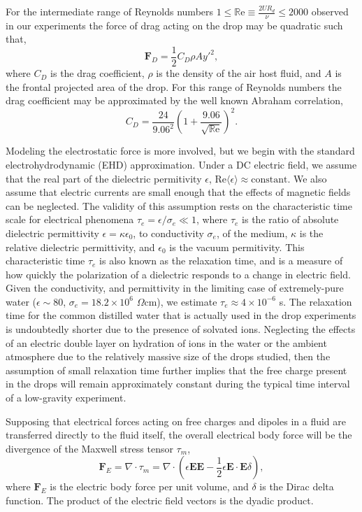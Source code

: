 \documentclass[12pt,a4paper,oneside]{book}
\begin{document}
For the intermediate range of Reynolds numbers $1 \leq \mathbb{R}\mbox{e} \equiv \frac{2UR_d}{\nu} \leq 2000 $ observed in our experiments the force of drag acting on the drop may be quadratic such that,
\begin{equation*}\label{drag_force}
\mathbf{F}_D = \frac{1}{2}C_D \rho A {y'}^2,
\end{equation*}
where $C_D$ is the drag coefficient, $\rho$ is the density of the air host fluid, and $A$ is the frontal projected area of the drop. For this range of Reynolds numbers the drag coefficient may be approximated by the well known Abraham correlation\cite{abraham_functional_1970},
\[C_D = \frac{24}{9.06^2} \left( 1 + \frac{9.06}{\sqrt{\mathbb{R}\mbox{e}}} \right)^2 .\]

Modeling the electrostatic force is more involved, but we begin with the standard electrohydrodynamic (EHD) approximation\cite{saville_electrohydrodynamics:_1997}. Under a DC electric field, we assume that the real part of the dielectric permitivity $\epsilon$, $\mbox{Re} \langle \epsilon \rangle \approx  \mbox{constant}$. We also assume that electric currents are small enough that the effects of magnetic fields can be neglected. The validity of this assumption rests on the characteristic time scale for electrical phenomena $\tau_e = \epsilon /\sigma_e \ll 1$, where $\tau_e$ is the ratio of absolute dielectric permittivity $\epsilon = \kappa \epsilon_0$, to conductivity $\sigma_e$, of the medium, $\kappa$ is the relative dielectric permittivity, and $\epsilon_0$ is the vacuum permitivity. This characteristic time $\tau_e$ is also known as the relaxation time, and is a measure of how quickly the polarization of a dielectric responds to a change in electric field. Given the conductivity, and permittivity in the limiting case of extremely-pure water ($ \epsilon \sim 80$, $\sigma_e = 18.2 \times 10^{6}$ $\Omega\mbox{cm}$)\cite{yatsuzuka_electrification_1994}, we estimate $\tau_e \approx 4 \times 10^{-6}$ s. The relaxation time for the common distilled water that is actually used in the drop experiments is undoubtedly shorter due to the presence of solvated ions. Neglecting the effects of an electric double layer on hydration of ions in the water or the ambient atmosphere due to the relatively massive size of the drops studied, then the assumption of small relaxation time further implies that the free charge present in the drops will remain approximately constant during the typical time interval of a low-gravity experiment.

Supposing that electrical forces acting on free charges and dipoles in a fluid are transferred directly to the fluid itself, the overall electrical body force will be the divergence of the Maxwell stress tensor $\tau_m $,
\[ \mathbf{F}_E = \nabla \cdot \tau_m = \nabla \cdot \left( \epsilon \mathbf{E} \mathbf{E} - \frac{1}{2} \epsilon \mathbf{E} \cdot \mathbf{E} \delta \right) ,\]
where $\mathbf{F}_E$ is the electric body force per unit volume, and $\delta$ is the Dirac delta function. The product of the electric field vectors is the dyadic product.  
\end{document}
